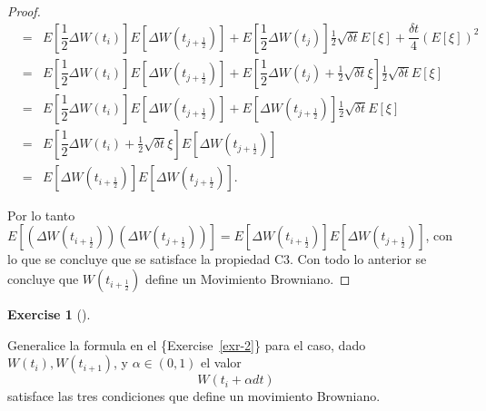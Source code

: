 \documentclass[
  letterpaper,
  DIV=11,
  numbers=noendperiod]{scrreprt}
\theoremstyle{plain}
\theoremstyle{definition}
\newtheorem{exercise}{Exercise}[chapter]
\theoremstyle{remark}
\begin{document}
\begin{proof}
\[\begin{eqnarray*}
  & = & E\left[\dfrac{1}{2}\Delta W(t_{i})\right]E\left[\Delta W(t_{j+\frac{1}{2}})\right]+E\left[\dfrac{1}{2}\Delta W(t_{j})\right]\frac{1}{2}\sqrt{\delta t}E\left[\xi\right]+\dfrac{\delta t}{4}\left(E\left[\xi\right]\right)^{2}\\
 & = & E\left[\dfrac{1}{2}\Delta W(t_{i})\right]E\left[\Delta W(t_{j+\frac{1}{2}})\right] +E\left[\dfrac{1}{2}\Delta W(t_{j})+\frac{1}{2}\sqrt{\delta t}\xi\right]\frac{1}{2}\sqrt{\delta t}E\left[\xi\right]\\
 & = & E\left[\dfrac{1}{2}\Delta W(t_{i})\right]E\left[\Delta W(t_{j+\frac{1}{2}})\right]+E\left[\Delta W(t_{j+\frac{1}{2}})\right]\frac{1}{2}\sqrt{\delta t}E\left[\xi\right]\\
 & = & E\left[\dfrac{1}{2}\Delta W(t_{i})+\frac{1}{2}\sqrt{\delta t}\xi\right]E\left[\Delta W(t_{j+\frac{1}{2}})\right]\\
 & = & E\left[\Delta W(t_{i+\frac{1}{2}})\right]E\left[\Delta W(t_{j+\frac{1}{2}})\right].
\end{eqnarray*}
\]

Por lo tanto
\(E\left[\left(\Delta W(t_{i+\frac{1}{2}})\right)\left(\Delta W(t_{j+\frac{1}{2}})\right)\right]= E\left[\Delta W(t_{i+\frac{1}{2}})\right]E\left[\Delta W(t_{j+\frac{1}{2}})\right]\),
con lo que se concluye que se satisface la propiedad C3. Con todo lo
anterior se concluye que \(W(t_{i+\frac{1}{2}})\) define un Movimiento
Browniano.

\end{proof}

\begin{exercise}[]\protect\hypertarget{exr-3}{}\label{exr-3}

Generalice la formula en el \{Exercise~\ref{exr-2}\} para el caso, dado
\(W(t_{i}), W(t_{i+1})\), y \(\alpha\in(0,1)\) el valor \[
W(t_{i}+\alpha dt)
\] satisface las tres condiciones que define un movimiento Browniano.

\end{exercise}
\end{document}
